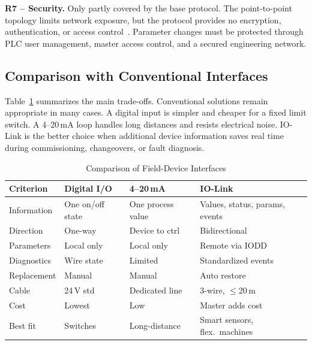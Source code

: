 \documentclass[conference]{IEEEtran}
\begin{document}
\textbf{R7 -- Security.}
Only partly covered by the base protocol. The point-to-point topology
limits network exposure, but the protocol provides no encryption,
authentication, or access control~\cite{iol_security}. Parameter
changes must be protected through PLC user management, master access
control, and a secured engineering network.

\subsection{Comparison with Conventional Interfaces}

Table~\ref{tab:compare} summarizes the main trade-offs. Conventional
solutions remain appropriate in many cases. A digital input is simpler
and cheaper for a fixed limit switch. A 4--20\,mA loop handles long
distances and resists electrical noise. IO-Link is the better choice
when additional device information saves real time during commissioning,
changeovers, or fault diagnosis.

\begin{table}[!t]
\caption{Comparison of Field-Device Interfaces}
\label{tab:compare}
\renewcommand{\arraystretch}{1.2}
\begin{tabularx}{\columnwidth}{@{}p{1.45cm} p{1.6cm} p{1.55cm} p{1.9cm}@{}}
\toprule
\textbf{Criterion} & \textbf{Digital I/O} & \textbf{4--20\,mA} & \textbf{IO-Link} \\
\midrule
Information  & One on/off state   & One process value  & Values, status, params, events \\[2pt]
Direction    & One-way            & Device to ctrl     & Bidirectional \\[2pt]
Parameters   & Local only         & Local only         & Remote via IODD \\[2pt]
Diagnostics  & Wire state         & Limited            & Standardized events \\[2pt]
Replacement  & Manual             & Manual             & Auto restore \\[2pt]
Cable        & 24\,V std          & Dedicated line     & 3-wire, $\leq$20\,m \\[2pt]
Cost         & Lowest             & Low                & Master adds cost \\[2pt]
Best fit     & Switches           & Long-distance      & Smart sensors, flex.\ machines \\
\bottomrule
\end{tabularx}
\end{table}
\end{document}
